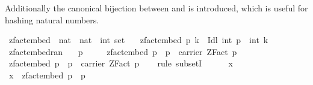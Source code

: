 \begin{isabellebody}
\begin{isamarkuptext}
Additionally the canonical bijection between  and 
is introduced, which is useful for hashing natural numbers.%
\end{isamarkuptext}\isamarkuptrue%
\isamarkupfalse%
\ zfact{\isacharunderscore}{\kern0pt}embed\ {\isacharcolon}{\kern0pt}{\isacharcolon}{\kern0pt}\ {\isachardoublequoteopen}nat\ {\isasymRightarrow}\ nat\ {\isasymRightarrow}\ int\ set{\isachardoublequoteclose}\ \isanewline
\ \ {\isachardoublequoteopen}zfact{\isacharunderscore}{\kern0pt}embed\ p\ k\ {\isacharequal}{\kern0pt}\ Idl\isactrlbsub {\isasymZ}\isactrlesub \ {\isacharbraceleft}{\kern0pt}int\ p{\isacharbraceright}{\kern0pt}\ {\isacharplus}{\kern0pt}{\isachargreater}{\kern0pt}\isactrlbsub {\isasymZ}\isactrlesub \ {\isacharparenleft}{\kern0pt}int\ k{\isacharparenright}{\kern0pt}{\isachardoublequoteclose}\isanewline
\isanewline
{}\isamarkupfalse%
\ zfact{\isacharunderscore}{\kern0pt}embed{\isacharunderscore}{\kern0pt}ran{\isacharcolon}{\kern0pt}\isanewline
\ \ \ {\isachardoublequoteopen}p\ {\isachargreater}{\kern0pt}\ {}{\isachardoublequoteclose}\isanewline
\ \ \ {\isachardoublequoteopen}zfact{\isacharunderscore}{\kern0pt}embed\ p\ {\isacharbackquote}{\kern0pt}\ {\isacharbraceleft}{\kern0pt}{}{\isachardot}{\kern0pt}{\isachardot}{\kern0pt}{\isacharless}{\kern0pt}p{\isacharbraceright}{\kern0pt}\ {\isacharequal}{\kern0pt}\ carrier\ {\isacharparenleft}{\kern0pt}ZFact\ p{\isacharparenright}{\kern0pt}{\isachardoublequoteclose}\isanewline
%
\isadelimproof
%
\endisadelimproof
%
\isatagproof
{}\isamarkupfalse%
\ {\isacharminus}{\kern0pt}\isanewline
\ \ \isamarkupfalse%
\ {\isachardoublequoteopen}zfact{\isacharunderscore}{\kern0pt}embed\ p\ {\isacharbackquote}{\kern0pt}\ {\isacharbraceleft}{\kern0pt}{}{\isachardot}{\kern0pt}{\isachardot}{\kern0pt}{\isacharless}{\kern0pt}p{\isacharbraceright}{\kern0pt}\ {\isasymsubseteq}\ carrier\ {\isacharparenleft}{\kern0pt}ZFact\ p{\isacharparenright}{\kern0pt}{\isachardoublequoteclose}\isanewline
\ \ \isamarkupfalse%
\ {\isacharparenleft}{\kern0pt}rule\ subsetI{\isacharparenright}{\kern0pt}\isanewline
\ \ \ \ \isamarkupfalse%
\ x\isanewline
\ \ \ \ \isamarkupfalse%
\ {\isachardoublequoteopen}x\ {\isasymin}\ zfact{\isacharunderscore}{\kern0pt}embed\ p\ {\isacharbackquote}{\kern0pt}\ {\isacharbraceleft}{\kern0pt}{}{\isachardot}{\kern0pt}{\isachardot}{\kern0pt}{\isacharless}{\kern0pt}p{\isacharbraceright}{\kern0pt}{\isachardoublequoteclose}\isanewline

\end{isabellebody}
